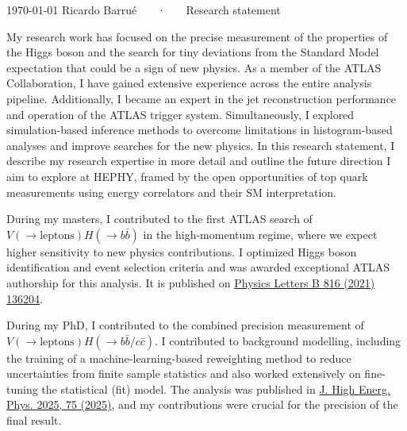 \documentclass[11pt, a4paper]{awesome-cv}
\begin{document}
\makecvheader[R]

\makecvfooter
  {\today}
  {Ricardo Barrué ~~~·~~~ Research statement}
  {}

\makelettertitle

\begin{cvletter}

  My research work has focused on the precise measurement of the properties of the Higgs boson and the search for tiny deviations from the Standard Model expectation that could be a sign of new physics. As a member of the ATLAS Collaboration, I have gained extensive experience across the entire analysis pipeline. Additionally, I became an expert in the jet reconstruction performance and operation of the ATLAS trigger system. Simultaneously, I explored simulation-based inference methods to overcome limitations in histogram-based analyses and improve searches for the new physics. In this research statement, I describe my research expertise in more detail and outline the future direction I aim to explore at HEPHY, framed by the open opportunities of top quark measurements using energy correlators and their SM interpretation.

  
  During my masters, I contributed to the first ATLAS search of $V(\to \textrm{leptons})H(\to b\bar{b})$ in the high-momentum regime, where we expect higher sensitivity to new physics contributions. I optimized Higgs boson identification and event selection criteria and was awarded exceptional ATLAS authorship for this analysis. It is published on \href{https://doi.org/10.1016/j.physletb.2021.136204}{Physics Letters B 816 (2021) 136204}.
  
  During my PhD, I contributed to the combined precision measurement of $V(\to \textrm{leptons})H(\to b\bar{b}/c\bar{c})$. I contributed to background modelling, including the training of a machine-learning-based reweighting method to reduce uncertainties from finite sample statistics and also worked extensively on fine-tuning the statistical (fit) model. The analysis was published in \href{https://doi.org/10.1007/JHEP04(2025)075}{J. High Energ. Phys. 2025, 75 (2025)}, and my contributions were crucial for the precision of the final result.
  

\end{cvletter}
\end{document}
